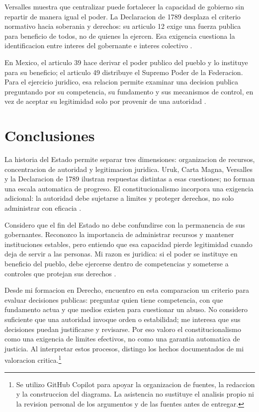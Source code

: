 \documentclass[spanish,letterpaper,oneside]{article}
\begin{document}
Versalles muestra que centralizar puede fortalecer la capacidad de
gobierno sin repartir de manera igual el poder. La Declaracion de 1789
desplaza el criterio normativo hacia soberania y derechos: su articulo
12 exige una fuerza publica para beneficio de todos, no de quienes la
ejercen. Esa exigencia cuestiona la identificacion entre interes del
gobernante e interes colectivo \citep{versaillesLouisXIV,francia1789}.

En Mexico, el articulo 39 hace derivar el poder publico del pueblo y
lo instituye para su beneficio; el articulo 49 distribuye el Supremo
Poder de la Federacion. Para el ejercicio juridico, esa relacion permite
examinar una decision publica preguntando por su competencia, su
fundamento y sus mecanismos de control, en vez de aceptar su legitimidad
solo por provenir de una autoridad \citep{cpeum2026S2,garciaRicci2011}.

\clearpage
\section{Conclusiones}

La historia del Estado permite separar tres dimensiones: organizacion
de recursos, concentracion de autoridad y legitimacion juridica.
Uruk, Carta Magna, Versalles y la Declaracion de 1789 ilustran respuestas
distintas a esas cuestiones; no forman una escala automatica de progreso.
El constitucionalismo incorpora una exigencia adicional: la autoridad
debe sujetarse a limites y proteger derechos, no solo administrar con
eficacia \citep{garciaRicci2011,francia1789}.

Considero que el fin del Estado no debe confundirse con la permanencia
de sus gobernantes. Reconozco la importancia de administrar recursos y
mantener instituciones estables, pero entiendo que esa capacidad pierde
legitimidad cuando deja de servir a las personas. Mi razon es juridica:
si el poder se instituye en beneficio del pueblo, debe ejercerse dentro
de competencias y someterse a controles que protejan sus derechos
\citep[arts.~1, 39 y 49]{cpeum2026S2}.

Desde mi formacion en Derecho, encuentro en esta comparacion un criterio
para evaluar decisiones publicas: preguntar quien tiene competencia,
con que fundamento actua y que medios existen para cuestionar un abuso.
No considero suficiente que una autoridad invoque orden o estabilidad;
me interesa que sus decisiones puedan justificarse y revisarse.
Por eso valoro el constitucionalismo como una exigencia de limites
efectivos, no como una garantia automatica de justicia.
Al interpretar estos procesos, distingo los hechos documentados de mi
valoracion critica.\footnote{Se utilizo GitHub Copilot para apoyar
la organizacion de fuentes, la redaccion y la construccion del diagrama.
La asistencia no sustituye el analisis propio ni la revision personal
de los argumentos y de las fuentes antes de entregar.}
\end{document}
